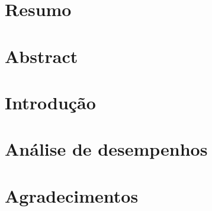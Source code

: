 \documentclass[12pt, a4paper]{book}
\begin{document}
	
	\chapter*{Resumo}
	\chapter*{Abstract}
	
	\tableofcontents    %
	
	\mainmatter
	
	\fancyhead[RE,LO]{\thesection}
	
	\chapter{Introdução}
	
	
	
	
	
	
	
	
	
	
	
	\chapter{Análise de desempenhos}
	\chapter*{Agradecimentos}
	
	\backmatter \singlespacing   %

	 
\end{document}
